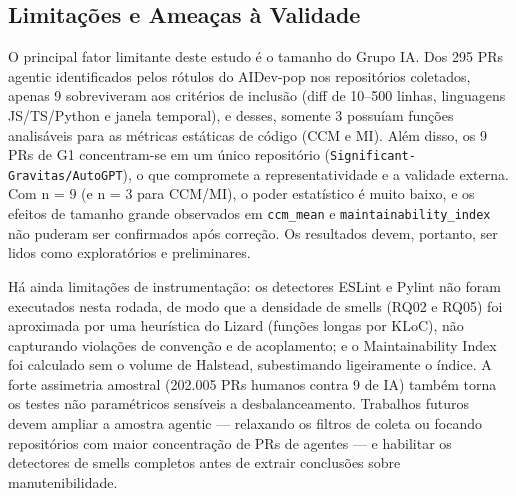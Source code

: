 \documentclass[12pt]{article}
\begin{document}
\subsection{Limitações e Ameaças à Validade}

O principal fator limitante deste estudo é o tamanho do Grupo IA. Dos 295 PRs
agentic identificados pelos rótulos do AIDev-pop nos repositórios coletados,
apenas 9 sobreviveram aos critérios de inclusão (diff de 10--500 linhas,
linguagens JS/TS/Python e janela temporal), e desses, somente 3 possuíam
funções analisáveis para as métricas estáticas de código (CCM e MI). Além
disso, os 9 PRs de G1 concentram-se em um único repositório
(\texttt{Significant-Gravitas/AutoGPT}), o que compromete a representatividade
e a validade externa. Com n = 9 (e n = 3 para CCM/MI), o poder estatístico é
muito baixo, e os efeitos de tamanho grande observados em \texttt{ccm\_mean}
e \texttt{maintainability\_index} não puderam ser confirmados após correção.
Os resultados devem, portanto, ser lidos como exploratórios e preliminares.

Há ainda limitações de instrumentação: os detectores ESLint e Pylint não
foram executados nesta rodada, de modo que a densidade de smells (RQ02 e RQ05)
foi aproximada por uma heurística do Lizard (funções longas por KLoC), não
capturando violações de convenção e de acoplamento; e o Maintainability Index
foi calculado sem o volume de Halstead, subestimando ligeiramente o índice.
A forte assimetria amostral (202.005 PRs humanos contra 9 de IA) também torna
os testes não paramétricos sensíveis a desbalanceamento. Trabalhos futuros
devem ampliar a amostra agentic --- relaxando os filtros de coleta ou focando
repositórios com maior concentração de PRs de agentes --- e habilitar os
detectores de smells completos antes de extrair conclusões sobre
manutenibilidade.




\end{document}

